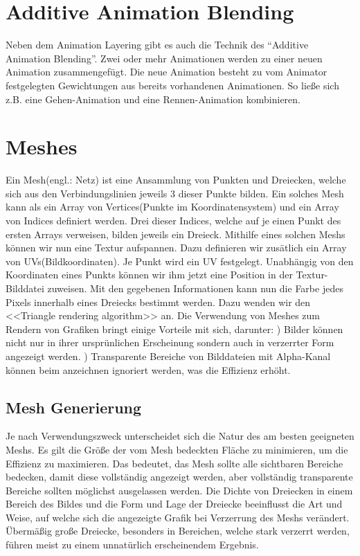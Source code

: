 \section{Additive Animation Blending}
%
Neben dem Animation Layering gibt es auch die Technik des ``Additive Animation Blending''. Zwei oder mehr Animationen werden zu einer neuen Animation zusammengefügt. Die neue Animation besteht zu vom Animator festgelegten Gewichtungen aus bereits vorhandenen Animationen. So ließe sich z.B. eine Gehen-Animation und eine Rennen-Animation kombinieren. 
%
\section{Meshes}
%
Ein Mesh(engl.: Netz) ist eine Ansammlung von Punkten und Dreiecken, welche sich aus den Verbindungslinien jeweils 3 dieser Punkte bilden. Ein solches Mesh kann als ein Array von Vertices(Punkte im Koordinatensystem) und ein Array von Indices definiert werden. Drei dieser Indices, welche auf je einen Punkt des ersten Arrays verweisen, bilden jeweils ein Dreieck. Mithilfe eines solchen Meshs können wir nun eine Textur aufspannen. Dazu definieren wir zusätlich ein Array von UVs(Bildkoordinaten). Je Punkt wird ein UV festgelegt. Unabhängig von den Koordinaten eines Punkts können wir ihm jetzt eine Position in der Textur-Bilddatei zuweisen. Mit den gegebenen Informationen kann nun die Farbe jedes Pixels innerhalb eines Dreiecks bestimmt werden. Dazu wenden wir den <<Triangle rendering algorithm>> an.
\newline\newline
Die Verwendung von Meshes zum Rendern von Grafiken bringt einige Vorteile mit sich, darunter: 
) Bilder können nicht nur in ihrer ursprünlichen Erscheinung sondern auch in verzerrter Form angezeigt werden.
) Transparente Bereiche von Bilddateien mit Alpha-Kanal können beim anzeichnen ignoriert werden, was die Effizienz erhöht.
%
\subsection{Mesh Generierung}
%
Je nach Verwendungszweck unterscheidet sich die Natur des am besten geeigneten Meshs. Es gilt die Größe der vom Mesh bedeckten Fläche zu minimieren, um die Effizienz zu maximieren. Das bedeutet, das Mesh sollte alle sichtbaren Bereiche bedecken, damit diese vollständig angezeigt werden, aber vollständig transparente Bereiche sollten möglichst ausgelassen werden.\newline
\newline
Die Dichte von Dreiecken in einem Bereich des Bildes und die Form und Lage der Dreiecke beeinflusst die Art und Weise, auf welche sich die angezeigte Grafik bei Verzerrung des Meshs verändert. Übermäßig große Dreiecke, besonders in Bereichen, welche stark verzerrt werden, führen meist zu einem unnatürlich erscheinendem Ergebnis.
%
